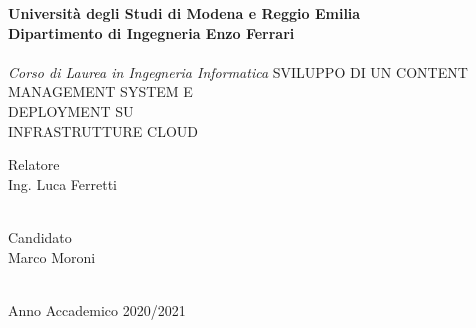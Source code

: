 \documentclass[12pt,a4paper]{article}
\begin{document}
\begin{titlepage}
    \begin{center}
    {

        \large
        \textbf{Università  degli Studi di Modena e Reggio Emilia} \\
        \textbf{Dipartimento di Ingegneria Enzo Ferrari} \\
        \hspace*{0cm} \hrulefill \hspace*{0cm} \\
        \emph{Corso di Laurea in Ingegneria Informatica}
        \vspace{5mm}
        \vspace{10mm}
        \huge{\uppercase{
        Sviluppo di un Content\\
        Management System e\\
        Deployment su\\
        Infrastrutture Cloud\\}}}
        \vspace{5mm}


    \end{center}
    \vspace{25mm}
    \par
    \noindent
    \begin{minipage}[t]{0.47\textwidth}
        {\large{ Relatore\\
        Ing. Luca Ferretti}}\\
        \\
    \end{minipage}
    \hfill
    \begin{minipage}[t]{0.47\textwidth}\raggedleft
        {\large{ Candidato\\
        Marco Moroni}}
    \end{minipage}
    \vspace{20mm}
    \begin{center}
        \hspace*{0cm} \hrulefill \hspace*{0cm} \\
        {\large{
        Anno Accademico 2020/2021}}
    \end{center}

\end{titlepage}
\end{document}
